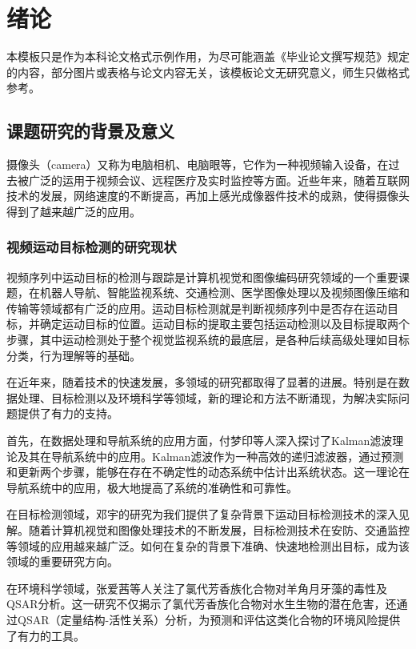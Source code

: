 
\section{绪论}

本模板只是作为本科论文格式示例作用，为尽可能涵盖《毕业论文撰写规范》规定的内容，部分图片或表格与论文内容无关，该模板论文无研究意义，师生只做格式参考。

\subsection{课题研究的背景及意义}

摄像头（camera）又称为电脑相机、电脑眼等，它作为一种视频输入设备，在过去被广泛的运用于视频会议、远程医疗及实时监控等方面。近些年来，随着互联网技术的发展，网络速度的不断提高，再加上感光成像器件技术的成熟，使得摄像头得到了越来越广泛的应用。

\subsubsection{视频运动目标检测的研究现状}

视频序列中运动目标的检测与跟踪是计算机视觉和图像编码研究领域的一个重要课题，在机器人导航、智能监视系统、交通检测、医学图像处理以及视频图像压缩和传输等领域都有广泛的应用。运动目标检测就是判断视频序列中是否存在运动目标，并确定运动目标的位置。运动目标的提取主要包括运动检测以及目标提取两个步骤，其中运动检测处于整个视觉监视系统的最底层，是各种后续高级处理如目标分类，行为理解等的基础。

在近年来，随着技术的快速发展，多领域的研究都取得了显著的进展。特别是在数据处理、目标检测以及环境科学等领域，新的理论和方法不断涌现，为解决实际问题提供了有力的支持。

首先，在数据处理和导航系统的应用方面，付梦印等人深入探讨了Kalman滤波理论及其在导航系统中的应用。Kalman滤波作为一种高效的递归滤波器，通过预测和更新两个步骤，能够在存在不确定性的动态系统中估计出系统状态。这一理论在导航系统中的应用，极大地提高了系统的准确性和可靠性。

在目标检测领域，邓宇的研究为我们提供了复杂背景下运动目标检测技术的深入见解。随着计算机视觉和图像处理技术的不断发展，目标检测技术在安防、交通监控等领域的应用越来越广泛。如何在复杂的背景下准确、快速地检测出目标，成为该领域的重要研究方向。

在环境科学领域，张爱茜等人关注了氯代芳香族化合物对羊角月牙藻的毒性及QSAR分析。这一研究不仅揭示了氯代芳香族化合物对水生生物的潜在危害，还通过QSAR（定量结构-活性关系）分析，为预测和评估这类化合物的环境风险提供了有力的工具。

